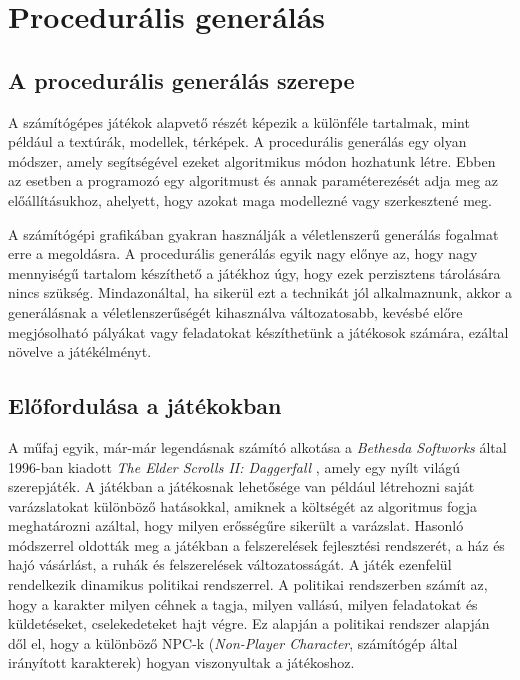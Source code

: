 \chapter{Procedurális generálás}

\section{A procedurális generálás szerepe}

A számítógépes játékok alapvető részét képezik a különféle tartalmak, mint például a textúrák, modellek, térképek. A procedurális generálás egy olyan módszer, amely segítségével ezeket algoritmikus módon hozhatunk létre. Ebben az esetben a programozó egy algoritmust és annak paraméterezését adja meg az előállításukhoz, ahelyett, hogy azokat maga modellezné vagy szerkesztené meg.

A számítógépi grafikában gyakran használják a véletlenszerű generálás fogalmat erre a megoldásra. A procedurális generálás egyik nagy előnye az, hogy nagy mennyiségű tartalom készíthető a játékhoz úgy, hogy ezek perzisztens tárolására nincs szükség. Mindazonáltal, ha sikerül ezt a technikát jól alkalmaznunk, akkor a generálásnak a véletlenszerűségét kihasználva változatosabb, kevésbé előre megjósolható pályákat vagy feladatokat készíthetünk a játékosok számára, ezáltal növelve a játékélményt.  

\section{Előfordulása a játékokban}

A műfaj egyik, már-már legendásnak számító alkotása a \textit{Bethesda Softworks} által 1996-ban kiadott \textit{The Elder Scrolls II: Daggerfall} \cite{dragonfall}, amely egy nyílt világú szerepjáték. A játékban a játékosnak lehetősége van például létrehozni saját varázslatokat különböző hatásokkal, amiknek a költségét az algoritmus fogja meghatározni azáltal, hogy milyen erősségűre sikerült a varázslat. Hasonló módszerrel oldották meg a játékban a felszerelések fejlesztési rendszerét, a ház és hajó vásárlást, a ruhák és felszerelések változatosságát. A játék ezenfelül rendelkezik dinamikus politikai rendszerrel. A politikai rendszerben számít az, hogy a karakter milyen céhnek a tagja, milyen vallású, milyen feladatokat és küldetéseket, cselekedeteket hajt végre. Ez alapján a politikai rendszer alapján dől el, hogy a különböző NPC-k (\textit{Non-Player Character}, számítógép által irányított karakterek) hogyan viszonyultak a játékoshoz. 

